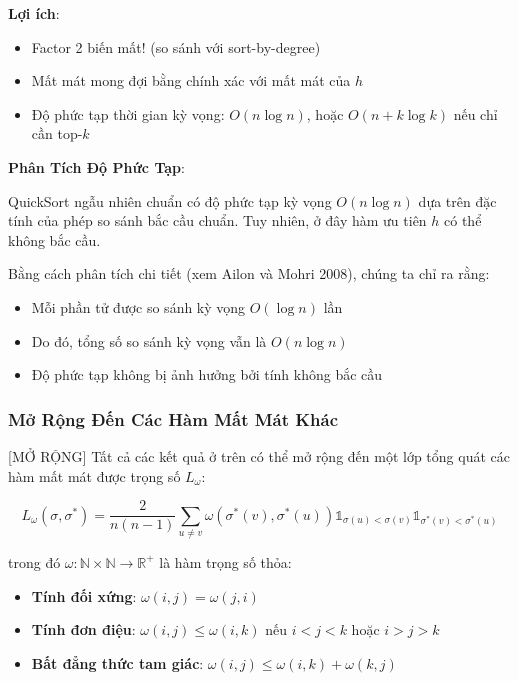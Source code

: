 \textbf{Lợi ích}:
\begin{itemize}
    \item Factor 2 biến mất! (so sánh với sort-by-degree)
    \item Mất mát mong đợi bằng chính xác với mất mát của $h$
    \item Độ phức tạp thời gian kỳ vọng: $O(n \log n)$, hoặc $O(n + k \log k)$ nếu chỉ cần top-$k$
\end{itemize}

\textbf{Phân Tích Độ Phức Tạp}:

QuickSort ngẫu nhiên chuẩn có độ phức tạp kỳ vọng $O(n \log n)$ dựa trên đặc tính của phép so sánh bắc cầu chuẩn. Tuy nhiên, ở đây hàm ưu tiên $h$ có thể không bắc cầu. 

Bằng cách phân tích chi tiết (xem Ailon và Mohri 2008), chúng ta chỉ ra rằng:
\begin{itemize}
    \item Mỗi phần tử được so sánh kỳ vọng $O(\log n)$ lần
    \item Do đó, tổng số so sánh kỳ vọng vẫn là $O(n \log n)$
    \item Độ phức tạp không bị ảnh hưởng bởi tính không bắc cầu
\end{itemize}

\subsubsection{Mở Rộng Đến Các Hàm Mất Mát Khác}

[MỞ RỘNG] Tất cả các kết quả ở trên có thể mở rộng đến một lớp tổng quát các hàm mất mát được trọng số $L_\omega$:

\begin{equation}
L_\omega(\sigma, \sigma^*) = \frac{2}{n(n-1)}\sum_{u \neq v} \omega(\sigma^*(v), \sigma^*(u)) \mathbb{1}_{\sigma(u) < \sigma(v)} \mathbb{1}_{\sigma^*(v) < \sigma^*(u)}
\end{equation}

trong đó $\omega: \mathbb{N} \times \mathbb{N} \to \mathbb{R}^+$ là hàm trọng số thỏa:

\begin{itemize}
    \item \textbf{Tính đối xứng}: $\omega(i,j) = \omega(j,i)$
    \item \textbf{Tính đơn điệu}: $\omega(i,j) \leq \omega(i,k)$ nếu $i < j < k$ hoặc $i > j > k$
    \item \textbf{Bất đẳng thức tam giác}: $\omega(i,j) \leq \omega(i,k) + \omega(k,j)$
\end{itemize}

